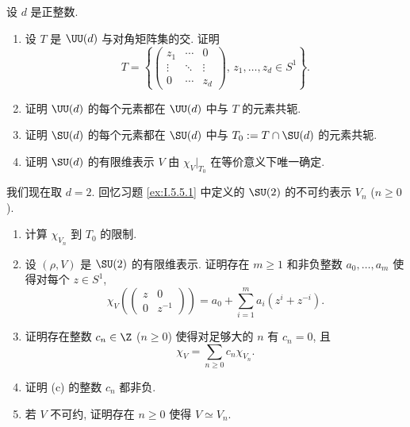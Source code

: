 \begin{exercise}[$\SU(d)$ 的表示]
\label{ex:IV.9.1}
设 $d$ 是正整数.
\begin{enumerate}
\item[(a)] 设 $T$ 是 $\UU(d)$ 与对角矩阵集的交. 证明
\[
T = \left\{\begin{pmatrix} z_1 & \cdots & 0 \\ \vdots & \ddots & \vdots \\ 0 & \cdots & z_d \end{pmatrix},\, z_1, \ldots, z_d \in S^1\right\}.
\]
\item[(b)] 证明 $\UU(d)$ 的每个元素都在 $\UU(d)$ 中与 $T$ 的元素共轭.
\item[(c)] 证明 $\SU(d)$ 的每个元素都在 $\SU(d)$ 中与 $T_0 := T \cap \SU(d)$ 的元素共轭.
\item[(d)] 证明 $\SU(d)$ 的有限维表示 $V$ 由 $\chi_V|_{T_0}$ 在等价意义下唯一确定.
\end{enumerate}
我们现在取 $d = 2$. 回忆习题 \ref{ex:I.5.5.1} 中定义的 $\SU(2)$ 的不可约表示 $V_n$ ($n \geq 0$).
\begin{enumerate}
\item[(a)] 计算 $\chi_{V_n}$ 到 $T_0$ 的限制.
\item[(b)] 设 $(\rho, V)$ 是 $\SU(2)$ 的有限维表示. 证明存在 $m \geq 1$ 和非负整数 $a_0, \ldots, a_m$ 使得对每个 $z \in S^1$,
\[
\chi_V\left(\begin{pmatrix} z & 0 \\ 0 & z^{-1} \end{pmatrix}\right) = a_0 + \sum_{i=1}^m a_i(z^i + z^{-i}).
\]
\item[(c)] 证明存在整数 $c_n \in \Z$ ($n \geq 0$) 使得对足够大的 $n$ 有 $c_n = 0$, 且
\[
\chi_V = \sum_{n \geq 0}c_n\chi_{V_n}.
\]
\item[(d)] 证明 (c) 的整数 $c_n$ 都非负.
\item[(e)] 若 $V$ 不可约, 证明存在 $n \geq 0$ 使得 $V \simeq V_n$.
\end{enumerate}
\end{exercise}

